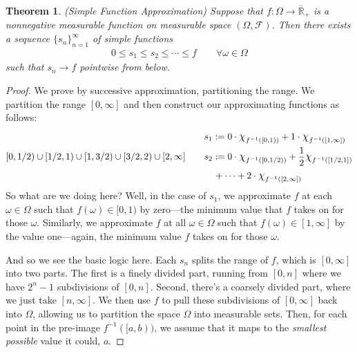 \documentclass[12pt]{article}
\theoremstyle{plain}
\newtheorem{thm}{Theorem}[section]
\theoremstyle{definition}
\theoremstyle{remark}
\newcommand*{\Chi}{\mbox{\large$\chi$}} %
\newcommand{\sF}{\mathscr{F}}
\newcommand{\R}{\mathbb{R}}
\newcommand{\ninf}{_{n=1}^\infty}
\begin{document}
\begin{thm}\emph{(Simple Function Approximation)}
\label{lebapprox}
Suppose that $f: \Omega\rightarrow \bar{\R}_+$ is a nonnegative
measurable function on measurable space $(\Omega,\sF)$. Then there
exists a sequence $\{s_n\}\ninf$ of simple functions
\begin{align*}
    0 \leq s_1 \leq s_2 \leq \cdots \leq f
    \qquad \forall \omega\in \Omega
\end{align*}
such that $s_n\rightarrow f$ pointwise from below.
\end{thm}
\begin{proof}
We prove by successive approximation, partitioning the range.
We partition the range $[0,\infty]$ and then construct our approximating
functions as follows:
\begin{align*}
    [0,1) \cup [1,\infty] \quad&\quad
        s_1 := 0\cdot \Chi_{f^{-1}([0,1) )}
        + 1 \cdot \Chi_{f^{-1}([1,\infty] )} \\
    [0,1/2) \cup [1/2,1) \cup [1,3/2)\cup [3/2, 2)
        \cup [2, \infty] \quad&\quad
        s_2 := 0\cdot \Chi_{f^{-1}([0,1/2) )}
        + \frac{1}{2} \Chi_{f^{-1}([1/2,1] )} \\
    &\qquad
        + \cdots
        + 2 \cdot \Chi_{f^{-1}([2,\infty] )}
\end{align*}
So what are we doing here? Well, in the case of $s_1$, we approximate
$f$ at each $\omega\in\Omega$ such that $f(\omega)\in [0,1)$ by
zero---the minimum value that $f$ takes on for those $\omega$.
Similarly, we approximate $f$ at all $\omega\in \Omega$ such that
$f(\omega)\in [1,\infty]$ by the value one---again, the minimum value
$f$ takes on for those $\omega$.

And so we see the basic logic here. Each $s_n$ splits the range of $f$,
which is $[0,\infty]$ into two parts. The first is a finely divided
part, running from $[0,n]$ where we have $2^n-1$ subdivisions of
$[0,n]$. Second, there's a coarsely divided part, where we just take
$[n,\infty]$.  We then use $f$ to pull these subdivisions of
$[0,\infty]$ back into $\Omega$, allowing us to partition the space
$\Omega$ into measurable sets. Then, for each point in the pre-image
$f^{-1}([a,b))$, we assume that it maps to the \emph{smallest possible}
  value it could, $a$.


\end{proof}
\end{document}
